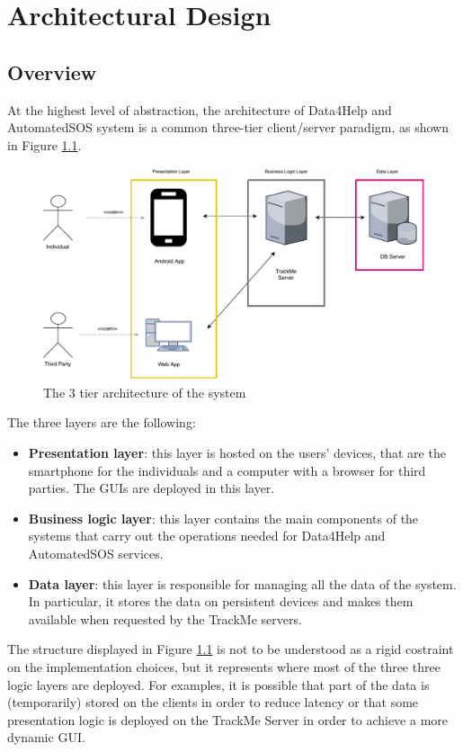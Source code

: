 \chapter{Architectural Design}

\section{Overview}

At the highest level of abstraction, the architecture of Data4Help and AutomatedSOS system is a common three-tier client/server paradigm, as shown in Figure \ref{f:3tier}.





\begin{figure}[H]
\centering
\includegraphics[scale=0.65]{resources/overview}
\caption{The 3 tier architecture of the system}\label{f:3tier}
\end{figure}
\noindent
The three layers are the following:

\begin{itemize}
\item \textbf{Presentation layer}: this layer is hosted on the users' devices, that are the smartphone for the individuals and a computer with a browser for third parties.
The GUIs are deployed in this layer.
\item \textbf{Business logic layer}: this layer contains the main components of the systems that carry out the operations needed for Data4Help and AutomatedSOS services.
\item \textbf{Data layer}: this layer is responsible for managing all the data of the system. 
In particular, it stores the data on persistent devices and makes them available when requested by the TrackMe servers.
\end{itemize}
The structure displayed in Figure \ref{f:3tier} is not to be understood as a rigid costraint on the implementation choices, but it represents where most of the three three logic layers are deployed.
For examples, it is possible that part of the data is (temporarily) stored on the clients in order to reduce latency or that some presentation logic is deployed on the TrackMe Server in order to achieve a more dynamic GUI.





